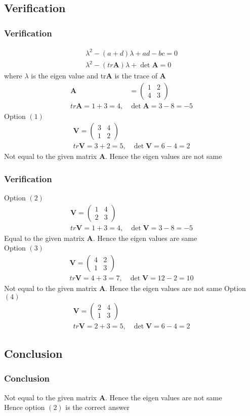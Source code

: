 \documentclass{beamer}
\providecommand{\brak}[1]{\ensuremath{\left(#1\right)}}
\theoremstyle{remark}
\newcommand{\myvec}[1]{\ensuremath{\begin{pmatrix}#1\end{pmatrix}}}
\let\vec\mathbf
\numberwithin{equation}{section}
\begin{document}
\subsection{Verification}
\begin{frame}
\frametitle{Verification}
 \begin{align}
     \lambda^2-\brak{a+d}\lambda+ad-bc=0 \\
 \lambda^2-\brak{tr\vec{A}}\lambda+\det{\vec{A}}=0
\end{align}
where $\lambda$ is the eigen value and tr$\vec{A}$ is the trace of $\vec{A}$
\begin{align}
    \vec{A}&=\myvec{1&2\\4&3}\\
    tr\vec{A}=1+3=4,&\det{\vec{A}}=3-8=-5
\end{align}
Option \brak{1}
\begin{align}
  \vec{V}=\myvec{3&4\\1&2}\\
  tr\vec{V}=3+2=5,&\det{\vec{V}}=6-4=2
\end{align}
Not equal to the given matrix $\vec{A}$. Hence the eigen values are not same \\
 \end{frame}
\begin{frame}
\frametitle{Verification}
Option \brak{2}
\begin{align}
  \vec{V}=\myvec{1&4\\2&3}\\
  tr\vec{V}=1+3=4,&\det{\vec{V}}=3-8=-5
\end{align}
Equal to the given matrix $\vec{A}$. Hence the eigen values are  same \\
Option \brak{3}
\begin{align}
  \vec{V}=\myvec{4&2\\1&3}\\
  tr\vec{V}=4+3=7,&\det{\vec{V}}=12-2=10
\end{align}
Not equal to the given matrix $\vec{A}$. Hence the eigen values are not same
Option \brak{4}
\begin{align}
  \vec{V}=\myvec{2&4\\1&3}\\
  tr\vec{V}=2+3=5,&\det{\vec{V}}=6-4=2
\end{align}
 \end{frame}
\subsection{Conclusion}
\begin{frame}[fragile]
\frametitle{Conclusion}
 Not equal to the given matrix $\vec{A}$. Hence the eigen values are not same \\

Hence option \brak{2} is the correct answer
\end{frame}
\end{document}
